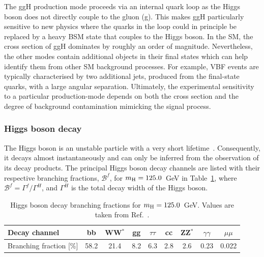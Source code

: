 The ggH production mode proceeds via an internal quark loop as the Higgs boson does not directly couple to the gluon (g). This makes ggH particularly sensitive to new physics where the quarks in the loop could in principle be replaced by a heavy BSM state that couples to the Higgs boson. In the SM, the cross section of ggH dominates by roughly an order of magnitude. Nevertheless, the other modes contain additional objects in their final states which can help identify them from other SM background processes. For example, VBF events are typically characterised by two additional jets, produced from the final-state quarks, with a large angular separation. Ultimately, the experimental sensitivity to a particular production-mode depends on both the cross section and the degree of background contamination mimicking the signal process.

\subsubsection{Higgs boson decay}
The Higgs boson is an unstable particle with a very short lifetime~\cite{Zyla:2020zbs}. Consequently, it decays almost instantaneously and can only be inferred from the observation of its decay products. The principal Higgs boson decay channels are listed with their respective branching fractions, $\mathcal{B}^f$, for $m_{\rm{H}}=125.0$~GeV in Table~\ref{tab:higgs_br}, where $\mathcal{B}^f=\Gamma^f/\Gamma^H$, and $\Gamma^H$ is the total decay width of the Higgs boson.

\begin{table}
    \caption[Higgs boson decay branching fractions]{Higgs boson decay branching fractions for $m_{\rm{H}}=125.0$~GeV. Values are taken from Ref.~\cite{deFlorian:2016spz}.}
    \label{tab:higgs_br}
    \centering
    \footnotesize
    \setlength{\tabcolsep}{8pt}
    \renewcommand{\arraystretch}{2}
    \begin{tabular}{l|c|c|c|c|c|c|c|c}
        \hline
        Decay channel & bb & WW$^{*}$ & gg & $\tau\tau$ & cc & ZZ$^{*}$ & $\gamma\gamma$ & $\mu\mu$   \\ \hline
        Branching fraction [\%] & 58.2 & 21.4 & 8.2 & 6.3 & 2.8 & 2.6 & 0.23 & 0.022  \\
        \hline
    \end{tabular}
\end{table}

